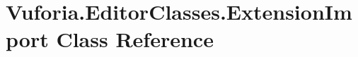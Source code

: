 \hypertarget{class_vuforia_1_1_editor_classes_1_1_extension_import}{}\section{Vuforia.\+Editor\+Classes.\+Extension\+Import Class Reference}
\label{class_vuforia_1_1_editor_classes_1_1_extension_import}
